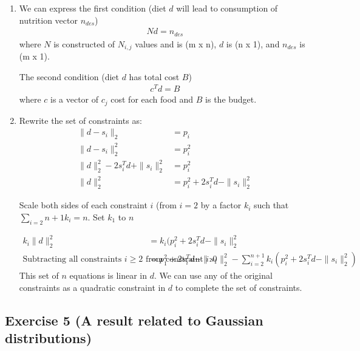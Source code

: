 \documentclass[11pt]{article}
\begin{document}
\begin{solution}
\begin{enumerate}
    \item We can express the first condition (diet $d$ will lead to consumption of nutrition vector $n_{des}$)
        \begin{align*}
            N d = n_{des}
        \end{align*}
        where $N$ is constructed of $N_{i,j}$ values and is (m x n), $d$ is (n x 1), and $n_{des}$ is (m x 1).

        The second condition (diet $d$ has total cost $B$)
        \begin{align*}
            c^T d = B
        \end{align*}
        where $c$ is a vector of $c_j$ cost for each food and $B$ is the budget.

    \item Rewrite the set of constraints as:
    \begin{align*}
        \|d - s_i\|_2 &= p_i \\
        \|d - s_i\|_2^2 &= p_i^2 \\
        \|d\|_2^2 - 2 s_i^T d + \|s_i\|_2^2 &= p_i^2 \\
        \|d\|_2^2 &= p_i^2 + 2 s_i^T d - \|s_i\|_2^2
    \end{align*}

    Scale both sides of each constraint $i$ (from $i=2$ by a factor $k_i$ such that $\sum_{i=2}{n+1} k_i = n$. Set $k_1$ to $n$

    \begin{align*}
        k_i \|d\|_2^2 &= k_i(p_i^2 + 2s_i^T d - \|s_i\|_2^2 \\
        \text{Subtracting all constraints } i \geq 2 \text{ from constraint } i: 0 &= p_1^2 + 2 s_i^T d - \|s_1\|_2^2 - \sum_{i=2}^{n+1} k_i(p_i^2 + 2s_i^T d - \|s_i\|_2^2)
    \end{align*}
    This set of $n$ equations is linear in $d$. We can use any of the original constraints as a quadratic constraint in $d$ to complete the set of constraints.
\end{enumerate}
\end{solution}

\newpage
\subsection*{Exercise 5 (A result related to Gaussian distributions)}
\end{document}
